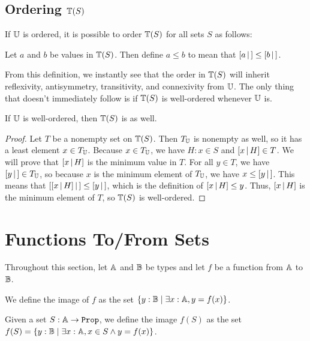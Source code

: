 \documentclass[../../math.tex]{subfiles}
\begin{document}
\subsection{Ordering $\mathbb{T}(S)$}

If $\mathbb{U}$ is ordered, it is possible to order $\mathbb{T}(S)$ for all sets $S$ as follows:

\begin{definition}
    Let $a$ and $b$ be values in $\mathbb{T}(S)$.  Then define $a \leq b$ to mean that
    $[ a\, |\,] \leq [ b\, |\,]$.
\end{definition}

From this definition, we instantly see that the order in $\mathbb{T}(S)$ will inherit
reflexivity, antisymmetry, transitivity, and connexivity from $\mathbb{U}$.  The only
thing that doesn't immediately follow is if $\mathbb{T}(S)$ is well-ordered whenever
$\mathbb{U}$ is.

\begin{theorem}
    If $\mathbb{U}$ is well-ordered, then $\mathbb{T}(S)$ is as well.
\end{theorem}
\begin{proof}
    Let $T$ be a nonempty set on $\mathbb{T}(S)$.  Then $T_{\mathbb{U}}$ is nonempty as well, so
    it has a least element $x \in T_{\mathbb{U}}$.  Because $x \in T_{\mathbb{U}}$, we have $H : x
    \in S$ and $[ x \, | \, H ] \in T$.  We will prove that $[ x \, | \, H ]$ is the minimum
    value in $T$.  For all $y \in T$, we have $[ y\, |\,] \in T_{\mathbb{U}}$, so because $x$
    is the minimum element of $T_{\mathbb{U}}$, we have $x \leq [ y\, |\,]$.  This means that
    $[ [ x \, | \, H ]\, |\,] \leq [ y\, |\,]$, which is the definition of $[ x \, | \, H ] \leq
    y$.  Thus, $[ x \, | \, H ]$ is the minimum element of $T$, so $\mathbb{T}(S)$ is
    well-ordered.
\end{proof}

\section{Functions To/From Sets}

Throughout this section, let $\mathbb{A}$ and $\mathbb{B}$ be types and let $f$ be a function
from $\mathbb{A}$ to $\mathbb{B}$.

\begin{definition}
    We define the image of $f$ as the set $\{y : \mathbb{B} \mid \exists x : \mathbb{A}, y =
    f(x)\}$.
\end{definition}

\begin{definition}
    Given a set $S : \A \rightarrow \Prop$, we define the image $f(S)$ as the
    set $f(S) = \{y : \mathbb{B} \mid \exists x : \mathbb{A}, x \in S \wedge y = f(x)\}$.
\end{definition}
\end{document}
